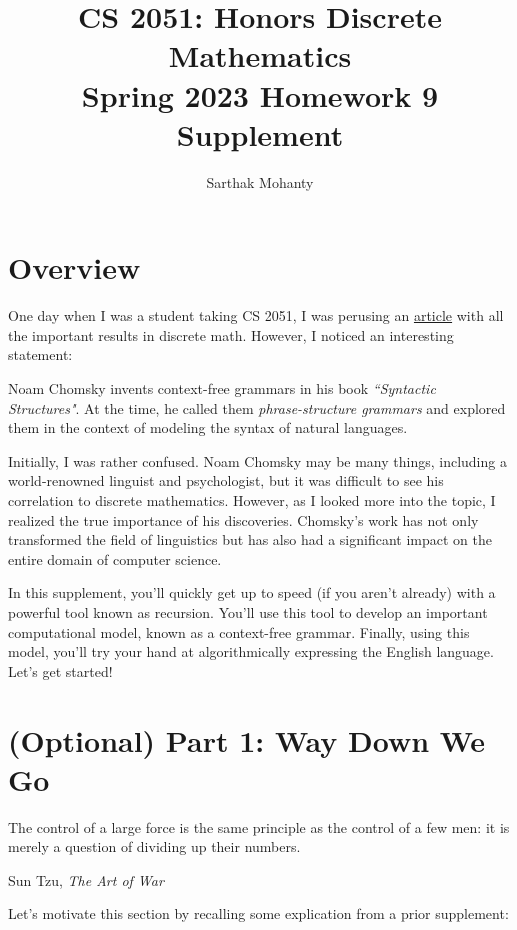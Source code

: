\documentclass{article}
\title{\vspace{-1cm}CS 2051: Honors Discrete Mathematics \\Spring 2023 Homework 9 Supplement}
\author{Sarthak Mohanty}
\date{}
\begin{document}
\maketitle

\vspace{-1cm}
\section*{Overview}
    One day when I was a student taking CS 2051, I was perusing an \href{https://web.stanford.edu/class/archive/cs/cs103/cs103.1234/timeline_of_results}{article} with all the important results in discrete math. However, I noticed an interesting statement: 
    \begin{tcolorbox}[colframe=gray!40, sharp corners]
        Noam Chomsky invents context-free grammars in his book \textit{``Syntactic Structures"}. At the time, he called them \textit{phrase-structure grammars} and explored them in the context of modeling the syntax of natural languages.
    \end{tcolorbox}
    Initially, I was rather confused. Noam Chomsky may be many things, including a world-renowned linguist and psychologist, but it was difficult to see his correlation to discrete mathematics. However, as I looked more into the topic, I realized the true importance of his discoveries. Chomsky's work has not only transformed the field of linguistics but has also had a significant impact on the entire domain of computer science.

    \vspace{2mm}
    In this supplement, you'll quickly get up to speed (if you aren't already) with a powerful tool known as recursion. You'll use this tool to develop an important computational model, known as a context-free grammar. Finally, using this model, you'll try your hand at algorithmically expressing the English language. Let's get started!

\section*{(Optional) Part 1: Way Down We Go}
\setlength{\epigraphwidth}{0.6\textwidth}
\epigraph{The control of a large force is the same principle as the control of a few men: it is merely a question of dividing up their numbers.}{Sun Tzu, \textit{The Art of War}}
Let's motivate this section by recalling some explication from a prior supplement:
\end{document}
